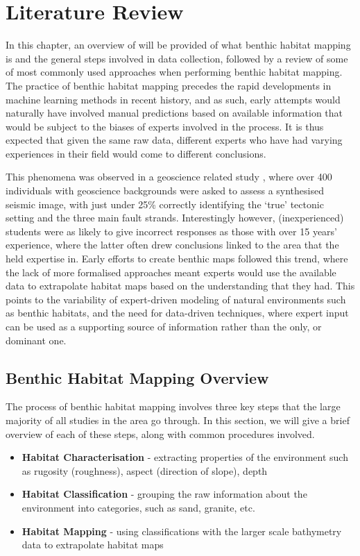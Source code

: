 \chapter{Literature Review} \label{chap:litreview}

In this chapter, an overview of will be provided of what benthic habitat mapping is and the general steps involved in data collection, followed by a review of some of most commonly used approaches when performing benthic habitat mapping. The practice of benthic habitat mapping precedes the rapid developments in machine learning methods in recent history, and as such, early attempts would naturally have involved manual predictions based on available information that would be subject to the biases of experts involved in the process. It is thus expected that given the same raw data, different experts who have had varying experiences in their field would come to different conclusions. 

This phenomena was observed in a geoscience related study \citep{bond07}, where over 400 individuals with geoscience backgrounds were asked to assess a synthesised seismic image, with just under 25\% correctly identifying the `true' tectonic setting and the three main fault strands. Interestingly however, (inexperienced) students were as likely to give incorrect responses as those with over 15 years' experience, where the latter often drew conclusions linked to the area that the held expertise in. Early efforts to create benthic maps followed this trend, where the lack of more formalised approaches meant experts would use the available data to extrapolate habitat maps based on the understanding that they had. This points to the variability of expert-driven modeling of natural environments such as benthic habitats, and the need for data-driven techniques, where expert input can be used as a supporting source of information rather than the only, or dominant one. 

\section{Benthic Habitat Mapping Overview}

The process of benthic habitat mapping involves three key steps that the large majority of all studies in the area go through\citep{ozcoasts}. In this section, we will give a brief overview of each of these steps, along with common procedures involved.
\begin{itemize}
    \item \textbf{Habitat Characterisation} - extracting properties of the environment such as rugosity (roughness), aspect (direction of slope), depth
    \item \textbf{Habitat Classification} - grouping the raw information about the environment into categories, such as sand, granite, etc.
    \item \textbf{Habitat Mapping} - using classifications with the larger scale bathymetry data to extrapolate habitat maps 
\end{itemize}

